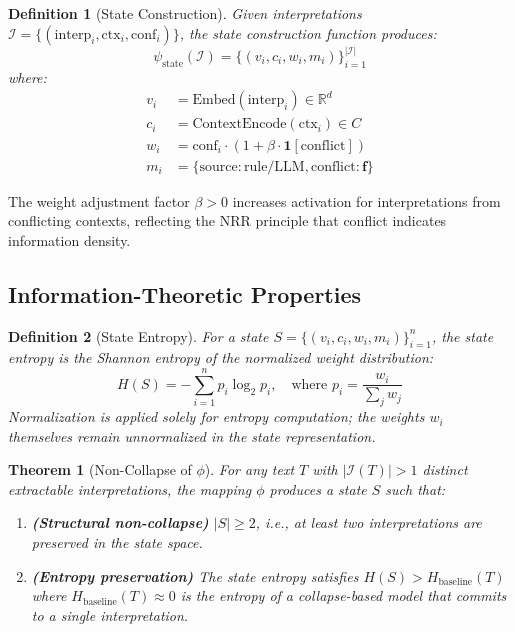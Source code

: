 \documentclass[11pt,a4paper]{article}
\newtheorem{definition}{Definition}
\newtheorem{theorem}{Theorem}
\begin{document}
\begin{definition}[State Construction]
Given interpretations $\mathcal{I} = \{(\text{interp}_i, \text{ctx}_i, \text{conf}_i)\}$, 
the state construction function produces:
\begin{equation}
\psi_{\text{state}}(\mathcal{I}) = \{(v_i, c_i, w_i, m_i)\}_{i=1}^{|\mathcal{I}|}
\end{equation}
where:
\begin{align}
v_i &= \text{Embed}(\text{interp}_i) \in \mathbb{R}^d \\
c_i &= \text{ContextEncode}(\text{ctx}_i) \in C \\
w_i &= \text{conf}_i \cdot (1 + \beta \cdot \mathbf{1}[\text{conflict}]) \\
m_i &= \{\text{source}: \text{rule/LLM}, \text{conflict}: \mathbf{f}\}
\end{align}
\end{definition}

The weight adjustment factor $\beta > 0$ increases activation for 
interpretations from conflicting contexts, reflecting the NRR principle 
that conflict indicates information density.

\subsection{Information-Theoretic Properties}

\begin{definition}[State Entropy]
For a state $S = \{(v_i, c_i, w_i, m_i)\}_{i=1}^{n}$, the \textit{state entropy} 
is the Shannon entropy of the normalized weight distribution:
\begin{equation}
H(S) = -\sum_{i=1}^{n} p_i \log_2 p_i, \quad \text{where } p_i = \frac{w_i}{\sum_j w_j}
\end{equation}
Normalization is applied solely for entropy computation; the weights $w_i$ 
themselves remain unnormalized in the state representation.
\end{definition}

\begin{theorem}[Non-Collapse of $\phi$]
\label{thm:noncollapse}
For any text $T$ with $|\mathcal{I}(T)| > 1$ distinct extractable interpretations, 
the mapping $\phi$ produces a state $S$ such that:
\begin{enumerate}
    \item \textbf{(Structural non-collapse)} $|S| \geq 2$, i.e., at least two 
          interpretations are preserved in the state space.
    \item \textbf{(Entropy preservation)} The state entropy satisfies
          $H(S) > H_{\text{baseline}}(T)$
          where $H_{\text{baseline}}(T) \approx 0$ is the entropy of a 
          collapse-based model that commits to a single interpretation.
\end{enumerate}
\end{theorem}
\end{document}
